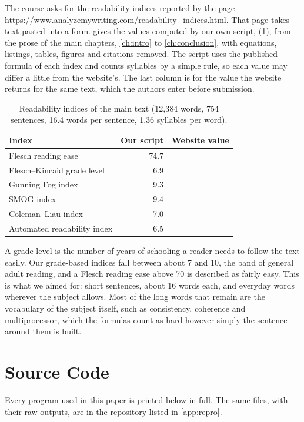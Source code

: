 The course asks for the readability indices reported by the page \url{https://www.analyzemywriting.com/readability_indices.html}. That page takes text pasted into a form.  gives the values computed by our own script,  (\cref{app:code}), from the prose of the main chapters, \cref{ch:intro} to \cref{ch:conclusion}, with equations, listings, tables, figures and citations removed. The script uses the published formula of each index and counts syllables by a simple rule, so each value may differ a little from the website's. The last column is for the value the website returns for the same text, which the authors enter before submission.

\begin{table}[h]
\centering\small
\caption{Readability indices of the main text (12{,}384 words, 754 sentences, 16.4 words per sentence, 1.36 syllables per word).}
\label{tab:read}
\begin{tabular}{@{}lrr@{}}
\toprule
Index & Our script & Website value\\
\midrule
Flesch reading ease & 74.7 & \\
Flesch--Kincaid grade level & 6.9 & \\
Gunning Fog index & 9.3 & \\
SMOG index & 9.4 & \\
Coleman--Liau index & 7.0 & \\
Automated readability index & 6.5 & \\
\bottomrule
\end{tabular}
\end{table}

A grade level is the number of years of schooling a reader needs to follow the text easily. Our grade-based indices fall between about 7 and 10, the band of general adult reading, and a Flesch reading ease above 70 is described as fairly easy. This is what we aimed for: short sentences, about 16 words each, and everyday words wherever the subject allows. Most of the long words that remain are the vocabulary of the subject itself, such as consistency, coherence and multiprocessor, which the formulas count as hard however simply the sentence around them is built.

\chapter{Source Code}
\label{app:code}

Every program used in this paper is printed below in full. The same files, with their raw outputs, are in the repository listed in \cref{app:repro}.

